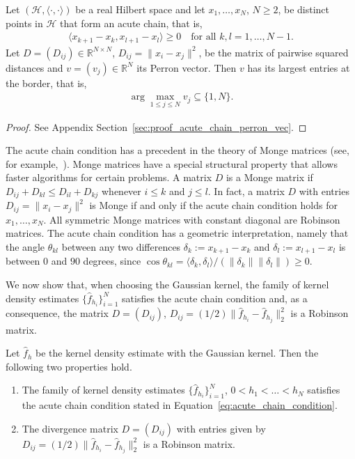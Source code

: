 \begin{Lem}\label{lem:acute_chain_perron_vec}
    Let $(\mathcal{H},\langle\cdot,\cdot\rangle)$ be a real Hilbert space and let $x_1,\dots,x_N$, $N\ge2$, be distinct points in $\mathcal{H}$ that form an acute chain, that is,
    \begin{align}\label{eq:acute_chain_condition}
        \langle x_{k+1}-x_k,x_{l+1}-x_l\rangle\ge0\quad\text{for all }k,l=1,\dots,N-1.
    \end{align}
    Let $D=(D_{ij})\in\mathbb{R}^{N\times N}$, $D_{ij}=\|x_i-x_j\|^2$, be the matrix of pairwise squared distances and $v=(v_j)\in\mathbb{R}^N$ its Perron vector. Then $v$ has its largest entries at the border, that is,
    \begin{align*}
        \arg\max_{1\le j\le N}v_j\subseteq\{1,N\}.
    \end{align*}
\end{Lem}

\begin{proof}
    See Appendix Section~\ref{sec:proof_acute_chain_perron_vec}.
\end{proof}

The acute chain condition has a precedent in the theory of Monge matrices (see, for example,~\cite{hutter_estimation_2020}). Monge matrices have a special structural property that allows faster algorithms for certain problems. A matrix $D$ is a Monge matrix if $D_{ij}+D_{kl}\le D_{il}+D_{kj}$ whenever $i\le k$ and $j\le l$. In fact, a matrix $D$ with entries $D_{ij}=\|x_i-x_j\|^2$ is Monge if and only if the acute chain condition holds for $x_1,\dots,x_N$. All symmetric Monge matrices with constant diagonal are Robinson matrices. The acute chain condition has a geometric interpretation, namely that the angle $\theta_{kl}$ between any two differences $\delta_k:=x_{k+1}-x_k$ and $\delta_l:=x_{l+1}-x_l$ is between $0$ and $90$ degrees, since $\cos{\theta_{kl}}=\langle\delta_k,\delta_l\rangle/(\|\delta_k\|\|\delta_l\|)\ge0$.

We now show that, when choosing the Gaussian kernel, the family of kernel density estimates $\{\hat{f}_{h_i}\}_{i=1}^{N}$ satisfies the acute chain condition and, as a consequence, the matrix $D=(D_{ij})$, $D_{ij}=(1/2)\|\hat{f}_{h_i}-\hat{f}_{h_j}\|_2^2$ is a Robinson matrix.

\begin{Prop}\label{prop:L2_divergence_matrix}
    Let $\hat{f}_h$ be the kernel density estimate with the Gaussian kernel. Then the following two properties hold.
    \begin{enumerate}
        \item[(a)] The family of kernel density estimates $\{\hat{f}_{h_i}\}_{i=1}^{N}$, $0<h_1<\dots<h_N$ satisfies the acute chain condition stated in Equation~\eqref{eq:acute_chain_condition}.
        \item[(b)] The divergence matrix $D=(D_{ij})$ with entries given by $D_{ij}=(1/2)\|\hat{f}_{h_i}-\hat{f}_{h_j}\|_2^2$ is a Robinson matrix.
    \end{enumerate}
\end{Prop}

